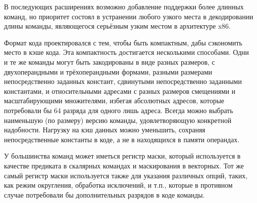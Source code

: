 \documentclass[forwardcom.tex]{subfiles}
\begin{document}
В последующих расширениях возможно добавление поддержки более длинных команд, но приоритет состоял в устранении любого узкого места в декодировании длины команды, являющегося серьёзным узким местом в архитектуре x86. 

Формат кода проектировался с тем, чтобы быть компактным, дабы сэкономить место в кэше кода. Эта компактность достигается несколькими способами. Одни и те же команды могут быть закодированы в виде разных размеров, с двухоперандными и трёхоперандными формами, разными размерами непосредственно заданных констант, сдвинутыми непосредственно заданными константами, и относительными адресами с разных размеров смещениями и масштабирующими множителями, избегая абсолютных адресов, которые потребовали бы 64 разряда для одного лишь адреса. Всегда можно выбрать наименьшую (по размеру) версию команды, удовлетворяющую конкретной надобности. Нагрузку на кэш данных можно уменьшить, сохраняя непосредственные константы в коде, а не в находящихся в памяти операндах.

У большинства команд может иметься регистр маски, который используется в качестве предиката в скалярных командах и маскирования в векторных. Тот же самый регистр маски используется также для указания различных опций, таких, как режим округления, обработка исключений, и т.п., которые в противном случае потребовали бы дополнительных разрядов  в коде команды.
\end{document}
